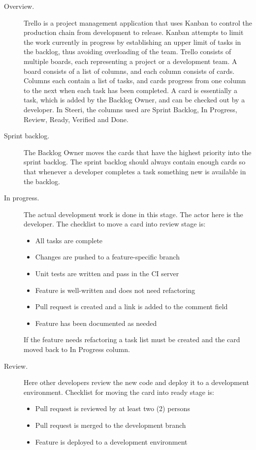 \documentclass[english]{tktltiki2}
\theoremstyle{definition}
\theoremstyle{remark}
\begin{document}
\begin{description}
\item[Overview.] Trello is a project management application that uses Kanban to control the production chain from development to release. Kanban attempts to limit the work currently in progress by establishing an upper limit of tasks in the backlog, thus avoiding overloading of the team. Trello consists of multiple boards, each representing a project or a development team. A board consists of a list of columns, and each column consists of cards. Columns each contain a list of tasks, and cards progress from one column to the next when each task has been completed. A card is essentially a task, which is added by the Backlog Owner, and can be checked out by a developer. In Steeri, the columns used are Sprint Backlog, In Progress, Review, Ready, Verified and Done. 
\item[Sprint backlog.] The Backlog Owner moves the cards that have the highest priority into the sprint backlog. The sprint backlog should always contain enough cards so that whenever a developer completes a task something new is available in the backlog.
\item[In progress.] The actual development work is done in this stage. The actor here is the developer. The checklist to move a card into review stage is:
\begin{itemize}
	\item  All tasks are complete
	\item  Changes are pushed to a feature-specific branch
	\item  Unit tests are written and pass in the CI server
	\item  Feature is well-written and does not need refactoring
	\item  Pull request is created and a link is added to the comment field
	\item  Feature has been documented as needed
\end{itemize}
If the feature needs refactoring a task list must be created and the card moved back to In Progress column.
\item[Review.] Here other developers review the new code and deploy it to a development environment. Checklist for moving the card into ready stage is:
\begin{itemize}
	\item  Pull request is reviewed by at least two (2) persons
	\item  Pull request is merged to the development branch
	\item  Feature is deployed to a development environment

\end{itemize}
\end{description}
\end{document}
